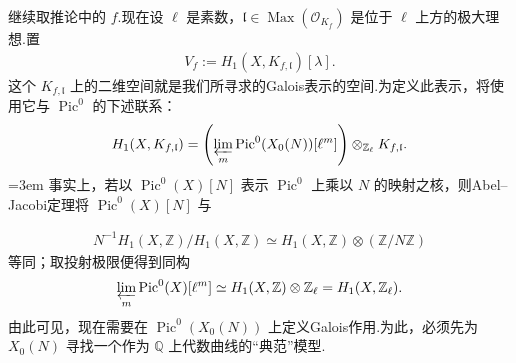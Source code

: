 继续取推论中的 $f$.现在设 $\ell$ 是素数，$\mathfrak l\in\operatorname{Max}(\mathcal O_{K_f})$ 是位于 $\ell$ 上方的极大理想.置
\begin{align*}
V_f:=H_1(X,K_{f,\mathfrak l})[\lambda].
\end{align*}
这个 $K_{f,\mathfrak l}$ 上的二维空间就是我们所寻求的Galois表示的空间.为定义此表示，将使用它与 $\operatorname{Pic}^0$ 的下述联系：
\begin{align*}
H_1(X,K_{f,\mathfrak l})
=\left(\varprojlim_m\operatorname{Pic}^0(X_0(N))[\ell^m]\right)\otimes_{\mathbb Z_\ell}K_{f,\mathfrak l}.
\end{align*}
\begingroup\emergencystretch=3em
事实上，若以 $\operatorname{Pic}^0(X)[N]$ 表示 $\operatorname{Pic}^0$ 上乘以 $N$ 的映射之核，则Abel--Jacobi定理将 $\operatorname{Pic}^0(X)[N]$ 与
\par\endgroup
\begin{align*}
N^{-1}H_1(X,\mathbb Z)/H_1(X,\mathbb Z)\simeq H_1(X,\mathbb Z)\otimes(\mathbb Z/N\mathbb Z)
\end{align*}
等同；取投射极限便得到同构
\begin{align*}
\varprojlim_m\operatorname{Pic}^0(X)[\ell^m]
\simeq H_1(X,\mathbb Z)\otimes\mathbb Z_\ell=H_1(X,\mathbb Z_\ell).
\end{align*}
由此可见，现在需要在 $\operatorname{Pic}^0(X_0(N))$ 上定义Galois作用.为此，必须先为 $X_0(N)$ 寻找一个作为 $\mathbb Q$ 上代数曲线的``典范''模型.

